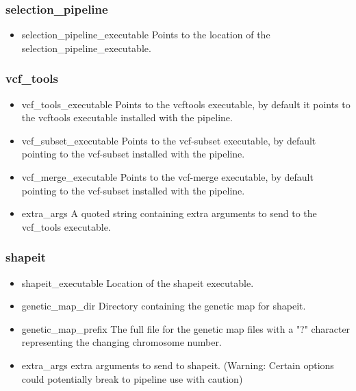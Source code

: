 \documentclass[a4paper,10pt]{article}
\begin{document}
\subsubsection{selection\_pipeline}
\begin{itemize}
\item selection\_pipeline\_executable
Points to the location of the selection\_pipeline\_executable. 
\end{itemize}
\subsubsection{vcf\_tools}
\begin{itemize}
\item vcf\_tools\_executable 
Points to the vcftools executable, by default it points to the vcftools executable installed with the pipeline.
\item vcf\_subset\_executable 
Points to the vcf-subset executable, by default pointing to the vcf-subset installed with the pipeline.
\item vcf\_merge\_executable
Points to the vcf-merge executable, by default pointing to the vcf-subset installed with the pipeline.
\item extra\_args 
A quoted string containing extra arguments to send to the vcf\_tools executable.
\end{itemize}
\subsubsection{shapeit}
\begin{itemize}
\item shapeit\_executable
Location of the shapeit executable.
\item genetic\_map\_dir 
Directory containing the genetic map for shapeit.
\item genetic\_map\_prefix 
The full file for the genetic map files with a "?" character representing the changing chromosome number.
\item extra\_args extra arguments to send to shapeit. (Warning: Certain options could potentially break to pipeline use with caution)
\end{itemize}
\end{document}
